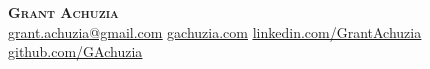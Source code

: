 \begin{center}
    \textbf{\Huge \scshape Grant Achuzia} \\ \vspace{1pt}
    \href{mailto:grant.achuzia@gmail.com}{ \underline{grant.achuzia@gmail.com}} \quad
    \href{https://gachuzia.com/}{ \underline{gachuzia.com}} \quad
    \href{https://www.linkedin.com/in/grant-achuzia-8259251b8/}{ \underline{linkedin.com/GrantAchuzia}} \quad
    \href{https://github.com/GAchuzia}{ \underline{github.com/GAchuzia}} \quad
    
\end{center}